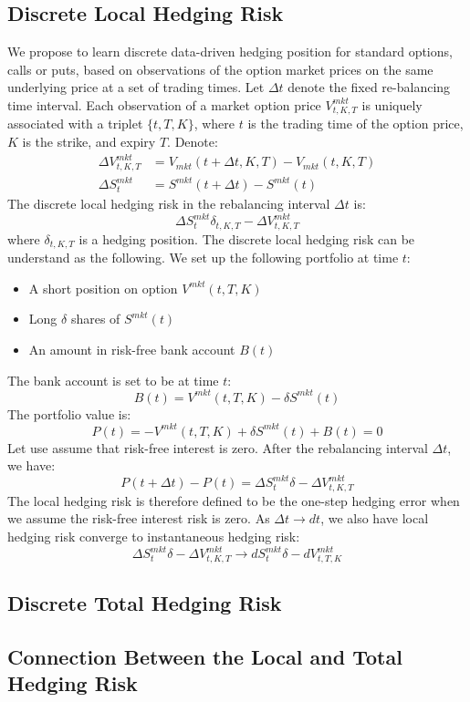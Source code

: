 \documentclass[letterpaper,12pt,titlepage,oneside,final]{book}
\numberwithin{equation}{section}
\theoremstyle{definition}
\newcommand{\DT}{\Delta t}
\newcommand{\Vmkt}{V^{mkt}}
\newcommand{\Smkt}{S^{mkt}}
\begin{document}
\subsection{Discrete Local Hedging Risk}
We propose to learn discrete data-driven hedging position for standard options, calls or puts, based on observations of the option market prices on the same underlying price at a set of trading times. Let $\DT$ denote the fixed re-balancing time interval.
Each observation of a market option price  $V^{mkt}_{t,K,T}$ is uniquely associated with a triplet $\{t,T,K\}$, where $t$ is the trading time of the option price,  $K$ is the strike, and expiry $T$.
  Denote:
\begin{equation}
\begin{split}
\Delta V^{mkt}_{t,K,T}& =V_{mkt}(t+\Delta t,K,T)-V_{mkt}(t,K,T)\\
\Delta \Smkt_{t} &=\Smkt(t+\DT)-\Smkt(t)
\end{split}
\label{eq:DVDS}
\end{equation}
The discrete local hedging risk in the rebalancing interval $\DT$ is:
\[
\Delta \Smkt_{t}\delta_{t,K,T} -\Delta V^{mkt}_{t,K,T}
\]
where $\delta_{t,K,T}$ is a hedging position.
The discrete local hedging risk can be understand as the following.
We set up the following portfolio at time $t$:
\begin{itemize}
\item A short position on option $\Vmkt(t,T,K)$
\item Long $\delta$ shares of $\Smkt(t)$
\item An amount in risk-free bank account $B(t)$
\end{itemize}
The bank account is set to be at time $t$: 
\[
    B(t)=\Vmkt(t,T,K)-\delta\Smkt(t)
\]
The portfolio value is:
\[
P(t)=-\Vmkt(t,T,K)+\delta\Smkt(t)+B(t)=0
\]
Let use assume that risk-free interest is zero. After the rebalancing interval $\DT$,
we have:
\[
    P(t+\DT)-P(t)=\Delta \Smkt_{t}\delta -\Delta V^{mkt}_{t,K,T}
\]
The local hedging risk is therefore defined to be the one-step hedging error when we assume the risk-free interest risk is zero. As $\DT \rightarrow dt$, we also have local hedging risk converge to instantaneous hedging risk: 
\[
\Delta \Smkt_{t}\delta -\Delta V^{mkt}_{t,K,T}  \rightarrow d\Smkt_{t}\delta-d \Vmkt_{t,T,K}
\]

\subsection{Discrete Total Hedging Risk}
\subsection{Connection Between the Local and Total Hedging Risk}
\end{document}
